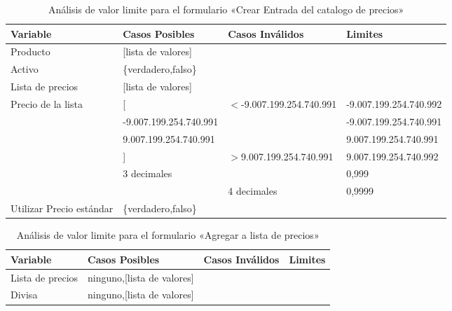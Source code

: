 \begin{table}
\centering
\begin{tabular}{|p{3.0cm}|p{4.0cm}|p{4.0cm}|l|}
\hline
\footnotesize{\textbf{Variable}} & \footnotesize{\textbf{Casos Posibles}} & \footnotesize{\textbf{Casos Inválidos}} & \footnotesize{\textbf{Limites}} \\
\hline
\footnotesize{Producto} & \footnotesize{[lista de valores]} & & \\
\hline
\footnotesize{Activo}  & \footnotesize{\{verdadero,falso\}} & & \\
\hline
\footnotesize{Lista de precios} & \footnotesize{[lista de valores]} & & \\
\hline
\footnotesize{Precio de la lista} & \footnotesize{[} & \footnotesize{$<$-9.007.199.254.740.991} & \footnotesize{-9.007.199.254.740.992} \\
& \footnotesize{-9.007.199.254.740.991} & & \footnotesize{-9.007.199.254.740.991} \\
& \footnotesize{9.007.199.254.740.991} & & \footnotesize{9.007.199.254.740.991} \\
& \footnotesize{]} & \footnotesize{$>$9.007.199.254.740.991} & \footnotesize{9.007.199.254.740.992} \\
& \footnotesize{3 decimales} & & \footnotesize{0,999} \\
& & \footnotesize{4 decimales} & \footnotesize{0,9999} \\
\hline
\footnotesize{Utilizar Precio estándar} & \footnotesize{\{verdadero,falso\}} & & \\
\hline
\end{tabular}
\caption{Análisis de valor limite para el formulario «Crear Entrada del catalogo de precios»}
\label{myers_02}
\end{table}

\begin{table}
\centering
\begin{tabular}{|p{6.0cm}|l|l|l|}
\hline
\footnotesize{\textbf{Variable}} & \footnotesize{\textbf{Casos Posibles}} & \footnotesize{\textbf{Casos Inválidos}} & \footnotesize{\textbf{Limites}} \\
\hline
\footnotesize{Lista de precios} & \footnotesize{ninguno,[lista de valores]} & & \\
\hline
\footnotesize{Divisa} & \footnotesize{ninguno,[lista de valores]} & & \\
\hline
\end{tabular}
\caption{Análisis de valor limite para el formulario «Agregar a lista de precios»}
\label{myers_03}
\end{table}


